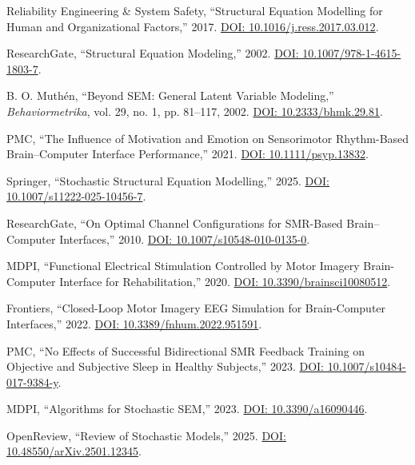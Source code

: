 \documentclass[conference]{IEEEtran}
\begin{document}
\begin{table}[t]
\begin{thebibliography}{54}
Reliability Engineering & System Safety, ``Structural Equation Modelling for Human and Organizational Factors,'' 2017. \href{https://doi.org/10.1016/j.ress.2017.03.012}{DOI: 10.1016/j.ress.2017.03.012}.

ResearchGate, ``Structural Equation Modeling,'' 2002. \href{https://doi.org/10.1007/978-1-4615-1803-7}{DOI: 10.1007/978-1-4615-1803-7}.

B. O. Muthén, ``Beyond SEM: General Latent Variable Modeling,'' \emph{Behaviormetrika}, vol. 29, no. 1, pp. 81--117, 2002. \href{https://doi.org/10.2333/bhmk.29.81}{DOI: 10.2333/bhmk.29.81}.

PMC, ``The Influence of Motivation and Emotion on Sensorimotor Rhythm-Based Brain–Computer Interface Performance,'' 2021. \href{https://doi.org/10.1111/psyp.13832}{DOI: 10.1111/psyp.13832}.

Springer, ``Stochastic Structural Equation Modelling,'' 2025. \href{https://doi.org/10.1007/s11222-025-10456-7}{DOI: 10.1007/s11222-025-10456-7}.

ResearchGate, ``On Optimal Channel Configurations for SMR-Based Brain–Computer Interfaces,'' 2010. \href{https://doi.org/10.1007/s10548-010-0135-0}{DOI: 10.1007/s10548-010-0135-0}.

MDPI, ``Functional Electrical Stimulation Controlled by Motor Imagery Brain-Computer Interface for Rehabilitation,'' 2020. \href{https://doi.org/10.3390/brainsci10080512}{DOI: 10.3390/brainsci10080512}.

Frontiers, ``Closed-Loop Motor Imagery EEG Simulation for Brain-Computer Interfaces,'' 2022. \href{https://doi.org/10.3389/fnhum.2022.951591}{DOI: 10.3389/fnhum.2022.951591}.

PMC, ``No Effects of Successful Bidirectional SMR Feedback Training on Objective and Subjective Sleep in Healthy Subjects,'' 2023. \href{https://doi.org/10.1007/s10484-017-9384-y}{DOI: 10.1007/s10484-017-9384-y}.

MDPI, ``Algorithms for Stochastic SEM,'' 2023. \href{https://doi.org/10.3390/a16090446}{DOI: 10.3390/a16090446}.

OpenReview, ``Review of Stochastic Models,'' 2025. \href{https://doi.org/10.48550/arXiv.2501.12345}{DOI: 10.48550/arXiv.2501.12345}.


\end{thebibliography}
\end{table}
\end{document}
